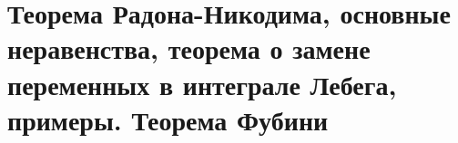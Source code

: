 \section{Теорема Радона-Никодима, основные неравенства, теорема о замене переменных в интеграле Лебега, примеры. Теорема Фубини}

